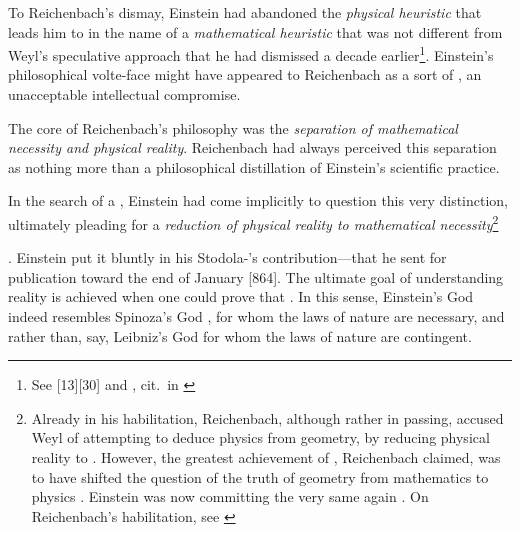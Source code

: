 \documentclass[draft]{article}
\begin{document}
To Reichenbach's dismay, Einstein had abandoned the \emph{physical heuristic} that leads him to \gr in the name of a \emph{mathematical heuristic} that was not different from Weyl's speculative approach that he had dismissed a decade earlier\footnote{See [13][30] and , cit.\ in \cite[274f.]{Seelig1960}}. Einstein's philosophical volte-face might have appeared to Reichenbach as a sort of , an unacceptable intellectual compromise. \begin{inparaenum}[(a)] \item The core of Reichenbach's philosophy was the \emph{separation of mathematical necessity and physical reality}. Reichenbach had always perceived this separation as nothing more than a philosophical distillation of Einstein's scientific practice. \item In the search of a \uft, Einstein had come implicitly to question this very distinction, ultimately pleading for a \emph{reduction of physical reality to mathematical necessity}\footnote{Already in his habilitation, Reichenbach, although rather in passing, accused Weyl of attempting to deduce physics from geometry, by reducing physical reality to  \citep[73]{Reichenbach1920a}. However, the greatest achievement of \gr, Reichenbach claimed, was to have shifted the question of the truth of geometry from mathematics to physics \citep[73]{Reichenbach1920a}. Einstein was now committing the very same  again \citep[73]{Reichenbach1920a}. On Reichenbach's habilitation, see \citet{Padovani2009}} \end{inparaenum}. Einstein put it bluntly in his Stodola-'s contribution---that he sent for publication toward the end of January [864]. The ultimate goal of understanding reality is achieved when one could prove that  \citep[127]{Einstein1929}. In this sense, Einstein's God indeed resembles Spinoza's God \citep{Einstein1929e}, for whom the laws of nature are necessary, and rather than, say, Leibniz's God for whom the laws of nature are contingent. 
\end{document}
